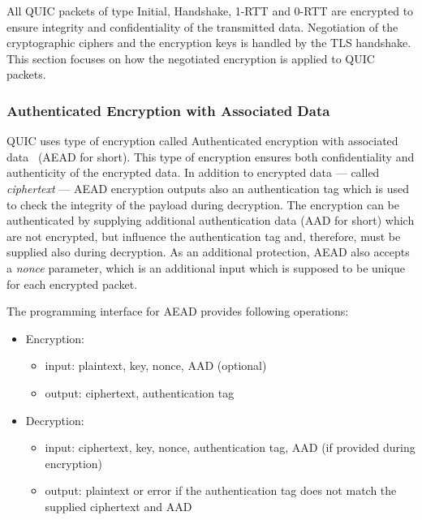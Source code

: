 All QUIC packets of type Initial, Handshake, 1-RTT and 0-RTT are encrypted to ensure integrity and
confidentiality of the transmitted data. Negotiation of the cryptographic ciphers and the encryption
keys is handled by the TLS handshake. This section focuses on how the negotiated encryption is
applied to QUIC packets.

\subsubsection{Authenticated Encryption with Associated Data}

QUIC uses type of encryption called Authenticated encryption with associated data~\cite{rfc5116}
(AEAD for short). This type of encryption ensures both confidentiality and authenticity of the
encrypted data. In addition to encrypted data --- called \textit{ciphertext} --- AEAD encryption
outputs also an authentication tag which is used to check the integrity of the payload during
decryption. The encryption can be authenticated by supplying additional authentication data (AAD for
short) which are not encrypted, but influence the authentication tag and, therefore, must be
supplied also during decryption. As an additional protection, AEAD also accepts a \textit{nonce}
parameter, which is an additional input which is supposed to be unique for each encrypted packet.

The programming interface for AEAD provides following operations:

\begin{itemize}

  \item Encryption:

  \begin{itemize}

    \item input: plaintext, key, nonce, AAD (optional)

    \item output: ciphertext, authentication tag

  \end{itemize}

  \item Decryption:

  \begin{itemize}

    \item input: ciphertext, key, nonce, authentication tag, AAD (if provided during encryption)

    \item output: plaintext or error if the authentication tag does not match the supplied
      ciphertext and AAD

  \end{itemize}

\end{itemize}

